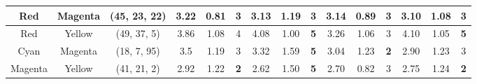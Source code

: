 \begin{table}[htbp]
{\begin{tabular}{@{}ccclcccccccccccc@{}}
    Red                     & \multicolumn{1}{c|}{Magenta}                   & \multicolumn{2}{c|}{\cellcolor[HTML]{FF0080}(45, 23, 22)}  & \multicolumn{1}{c|}{3.22} & \multicolumn{1}{c|}{0.81}  & \multicolumn{1}{c|}{3}                                  & \multicolumn{1}{c|}{3.13} & \multicolumn{1}{c|}{1.19}  & \multicolumn{1}{c|}{3}                                  & \multicolumn{1}{c|}{3.14}                   & \multicolumn{1}{c|}{0.89}                   & \multicolumn{1}{c|}{3}                                  & \multicolumn{1}{c|}{3.10}                   & \multicolumn{1}{c|}{1.08}                   & \multicolumn{1}{c|}{3}                                                    \\ \midrule
    Red                     & \multicolumn{1}{c|}{Yellow}                    & \multicolumn{2}{c|}{\cellcolor[HTML]{FF8000}(49, 37, 5)}   & \multicolumn{1}{c|}{3.86} & \multicolumn{1}{c|}{1.08}  & \multicolumn{1}{c|}{4}                                  & \multicolumn{1}{c|}{4.08} & \multicolumn{1}{c|}{1.00}  & \multicolumn{1}{c|}{\cellcolor[HTML]{32CB00}\textbf{5}} & \multicolumn{1}{c|}{3.26}                   & \multicolumn{1}{c|}{1.06}                   & \multicolumn{1}{c|}{3}                                  & \multicolumn{1}{c|}{4.10}                   & \multicolumn{1}{c|}{1.05}                   & \multicolumn{1}{c|}{\cellcolor[HTML]{32CB00}\textbf{5}}                   \\ \midrule
    Cyan                    & \multicolumn{1}{c|}{Magenta}                   & \multicolumn{2}{c|}{\cellcolor[HTML]{0000FF}(18, 7, 95)}   & \multicolumn{1}{c|}{3.5}  & \multicolumn{1}{c|}{1.19}  & \multicolumn{1}{c|}{3}                                  & \multicolumn{1}{c|}{3.32} & \multicolumn{1}{c|}{1.59}  & \multicolumn{1}{c|}{\cellcolor[HTML]{32CB00}\textbf{5}} & \multicolumn{1}{c|}{3.04}                   & \multicolumn{1}{c|}{1.23}                   & \multicolumn{1}{c|}{\cellcolor[HTML]{FD6864}\textbf{2}} & \multicolumn{1}{c|}{2.90}                   & \multicolumn{1}{c|}{1.23}                   & \multicolumn{1}{c|}{3}                                                    \\ \midrule
    Magenta                 & \multicolumn{1}{c|}{Yellow}                    & \multicolumn{2}{c|}{\cellcolor[HTML]{FF0000}(41, 21, 2)}   & \multicolumn{1}{c|}{2.92} & \multicolumn{1}{c|}{1.22}  & \multicolumn{1}{c|}{\cellcolor[HTML]{FD6864}\textbf{2}} & \multicolumn{1}{c|}{2.62} & \multicolumn{1}{c|}{1.50}  & \multicolumn{1}{c|}{\cellcolor[HTML]{32CB00}\textbf{5}} & \multicolumn{1}{c|}{2.70}                   & \multicolumn{1}{c|}{0.82}                   & \multicolumn{1}{c|}{3}                                  & \multicolumn{1}{c|}{2.75}                   & \multicolumn{1}{c|}{1.24}                   & \multicolumn{1}{c|}{\cellcolor[HTML]{FD6864}\textbf{2}}                   \\ \midrule

\end{tabular}}
\end{table}
